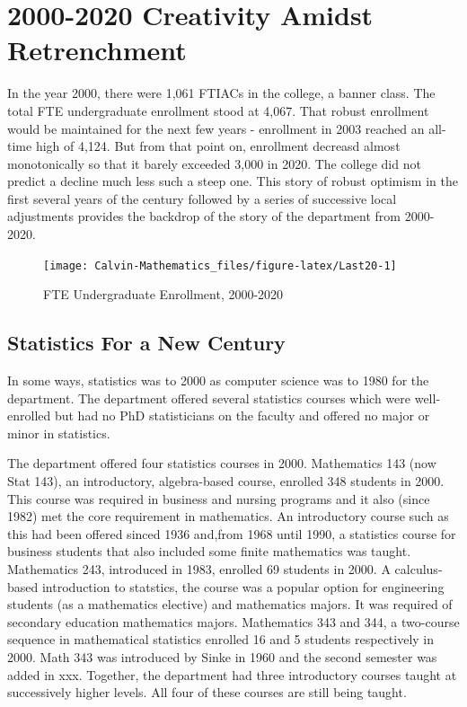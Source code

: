 \documentclass[
]{book}
\begin{document}
\hypertarget{creativity-amidst-retrenchment}{%
\chapter{2000-2020 Creativity Amidst Retrenchment}\label{creativity-amidst-retrenchment}}

In the year 2000, there were 1,061 FTIACs in the college, a banner class. The total FTE undergraduate enrollment stood at 4,067. That robust enrollment would be maintained for the next few years - enrollment in 2003 reached an all-time high of 4,124. But from that point on, enrollment decreasd almost monotonically so that it barely exceeded 3,000 in 2020. The college did not predict a decline much less such a steep one. This story of robust optimism in the first several years of the century followed by a series of successive local adjustments provides the backdrop of the story of the department from 2000-2020.

\begin{figure}

{\centering \texttt{[image: Calvin-Mathematics\_files/figure-latex/Last20-1]} 

}

\caption{FTE Undergraduate Enrollment, 2000-2020}\label{fig:Last20}
\end{figure}

\hypertarget{statistics-for-a-new-century}{%
\section{Statistics For a New Century}\label{statistics-for-a-new-century}}

In some ways, statistics was to 2000 as computer science was to 1980 for the department. The department offered several statistics courses which were well-enrolled but had no PhD statisticians on the faculty and offered no major or minor in statistics.

The department offered four statistics courses in 2000. Mathematics 143 (now Stat 143), an introductory, algebra-based course, enrolled 348 students in 2000. This course was required in business and nursing programs and it also (since 1982) met the core requirement in mathematics. An introductory course such as this had been offered sinced 1936 and,from 1968 until 1990, a statistics course for business students that also included some finite mathematics was taught.
Mathematics 243, introduced in 1983, enrolled 69 students in 2000. A calculus-based introduction to statstics, the course was a popular option for engineering students (as a mathematics elective) and mathematics majors. It was required of secondary education mathematics majors.
Mathematics 343 and 344, a two-course sequence in mathematical statistics enrolled 16 and 5 students respectively in 2000. Math 343 was introduced by Sinke in 1960 and the second semester was added in xxx. Together, the department had three introductory courses taught at successively higher levels. All four of these courses are still being taught.
\end{document}
